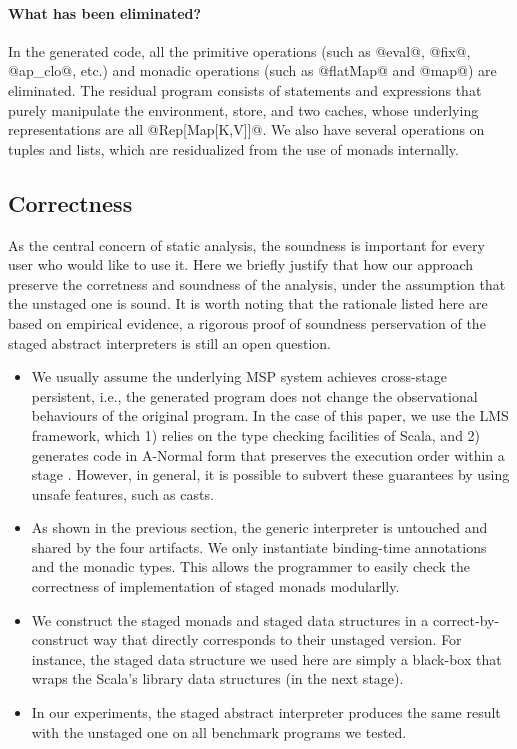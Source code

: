 \paragraph{What has been eliminated?} In the generated code, all the
primitive operations (such as @eval@, @fix@, @ap_clo@, etc.) and monadic
operations (such as @flatMap@ and @map@) are eliminated. The residual program
consists of statements and expressions that purely manipulate the environment,
store, and two caches, whose underlying representations are all @Rep[Map[K,V]]@. We
also have several operations on tuples and lists, which are residualized from
the use of monads internally.


\subsection{Correctness}

As the central concern of static analysis, the soundness is important for
every user who would like to use it. Here we briefly justify that how our
approach preserve the corretness and soundness of the analysis, under the
assumption that the unstaged one is sound. It is worth noting that the rationale
listed here are based on empirical evidence, a rigorous proof of soundness
perservation of the staged abstract interpreters is still an open question.

\begin{itemize}
  \item We usually assume the underlying MSP system achieves cross-stage
    persistent, i.e., the generated program does not change the observational
    behaviours of the original program. In the case of this paper, we use the
    LMS framework, which 1) relies on the type checking facilities of Scala, and
    2) generates code in A-Normal form \cite{Flanagan:1993:ECC:155090.155113}
    that preserves the execution order within a stage \cite{DBLP:conf/birthday/Rompf16}.
    However, in general, it is possible to subvert these guarantees by
    using unsafe features, such as casts.
  \item As shown in the previous section, the generic interpreter is untouched
    and shared by the four artifacts. We only instantiate binding-time
    annotations and the monadic types. This allows the programmer to easily
    check the correctness of implementation of staged monads modularlly.
  \item We construct the staged monads and staged data structures in a
    correct-by-construct way that directly corresponds to their unstaged
    version. For instance, the staged data structure we used here are simply
    a black-box that wraps the Scala's library data structures (in the next
    stage).
  \item In our experiments, the staged abstract interpreter produces the same
    result with the unstaged one on all benchmark programs we tested.
\end{itemize}

